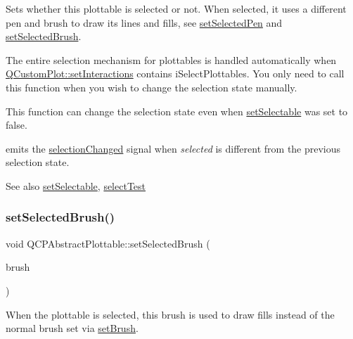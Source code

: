 Sets whether this plottable is selected or not. When selected, it uses a different pen and brush to draw its lines and fills, see \mbox{\hyperlink{class_q_c_p_abstract_plottable_a6911603cad23ab0469b108224517516f}{set\+Selected\+Pen}} and \mbox{\hyperlink{class_q_c_p_abstract_plottable_ae8c816874089f7a44001e8618e81a9dc}{set\+Selected\+Brush}}.

The entire selection mechanism for plottables is handled automatically when \mbox{\hyperlink{class_q_custom_plot_a5ee1e2f6ae27419deca53e75907c27e5}{Q\+Custom\+Plot\+::set\+Interactions}} contains i\+Select\+Plottables. You only need to call this function when you wish to change the selection state manually.

This function can change the selection state even when \mbox{\hyperlink{class_q_c_p_abstract_plottable_a22c69299eb5569e0f6bf084877a37dc4}{set\+Selectable}} was set to false.

emits the \mbox{\hyperlink{class_q_c_p_abstract_plottable_a3af66432b1dca93b28e00e78a8c7c1d9}{selection\+Changed}} signal when {\itshape selected} is different from the previous selection state.

\begin{DoxySeeAlso}{See also}
\mbox{\hyperlink{class_q_c_p_abstract_plottable_a22c69299eb5569e0f6bf084877a37dc4}{set\+Selectable}}, \mbox{\hyperlink{class_q_c_p_abstract_plottable_a38efe9641d972992a3d44204bc80ec1d}{select\+Test}} 
\end{DoxySeeAlso}
\mbox{\label{class_q_c_p_abstract_plottable_ae8c816874089f7a44001e8618e81a9dc}} 
\subsubsection{\texorpdfstring{set\+Selected\+Brush()}{setSelectedBrush()}}
{\footnotesize\ttfamily void Q\+C\+P\+Abstract\+Plottable\+::set\+Selected\+Brush (\begin{DoxyParamCaption}\item[{const Q\+Brush \&}]{brush }\end{DoxyParamCaption})}

When the plottable is selected, this brush is used to draw fills instead of the normal brush set via \mbox{\hyperlink{class_q_c_p_abstract_plottable_a7a4b92144dca6453a1f0f210e27edc74}{set\+Brush}}.

